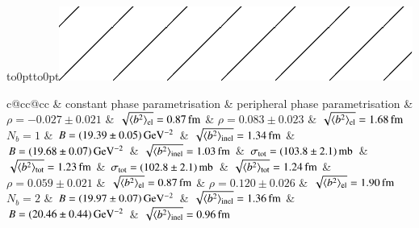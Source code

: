 \begin{table}
\caption{%
Parameters derived from the parameter-comparison fits presented in Figures~\ref{fig:fits common con} and \ref{fig:fits common per}. The rows correspond to different numbers of parameters in the nuclear modulus exponent. The left-hand (right-hand) side columns refer to fits with constant, Eq.~(\ref{eq:nuc phase con}), (peripheral, Eq.~(\ref{eq:nuc phase per})) nuclear phase parametrisation. The RMS values of impact parameter $b$ correspond to elastic (el), inelastic (inel) and any (tot) collisions. The combination $N_b = 1$ with constant phase is hatched as it is excluded by data, see Figure~\ref{fig:fits common con}.
}%
\vskip-3mm
\label{tab:fits common}
\begin{center}
\hbox to0pt{\hskip-25.5mm\vbox to0pt{\vskip6.5mm\includegraphics{fig/hatch_overlay.pdf}\vss}\hss}%
\small
\setlength{\tabcolsep}{5pt}
\begin{tabular}{c@{\hskip20pt}cc@{\hskip20pt}cc}
\hline
\hline
	& \hfil constant phase parametrisation \hfil & \hfil peripheral phase parametrisation\hfil  \cr
\hline
 			& $\rho = -0.027 \pm 0.021$ & $\sqrt{\langle b^2\rangle_{\rm el}} = 0.87\,{\rm fm}$					& $\rho = 0.083 \pm 0.023$ & $\sqrt{\langle b^2\rangle_{\rm el}} = 1.68\,{\rm fm}$					\cr
$N_b = 1$	& $B = (19.39 \pm 0.05)\,{\rm GeV^{-2}}$ & $\sqrt{\langle b^2\rangle_{\rm inel}} = 1.34\,{\rm fm}$		& $B = (19.68 \pm 0.07)\,{\rm GeV^{-2}}$ & $\sqrt{\langle b^2\rangle_{\rm inel}} = 1.03\,{\rm fm}$		\cr
			& $\sigma_{\rm tot} = (103.8 \pm 2.1)\,{\rm mb}$ & $\sqrt{\langle b^2\rangle_{\rm tot}} = 1.23\,{\rm fm}$	& $\sigma_{\rm tot} = (102.8 \pm 2.1)\,{\rm mb}$ & $\sqrt{\langle b^2\rangle_{\rm tot}} = 1.24\,{\rm fm}$	\cr\hline
%                                                                                                                                                                                                                   
 			& $\rho = 0.059 \pm 0.021$ & $\sqrt{\langle b^2\rangle_{\rm el}} = 0.87\,{\rm fm}$						& $\rho = 0.120 \pm 0.026$ & $\sqrt{\langle b^2\rangle_{\rm el}} = 1.90\,{\rm fm}$						\cr
$N_b = 2$	& $B = (19.97 \pm 0.07)\,{\rm GeV^{-2}}$ & $\sqrt{\langle b^2\rangle_{\rm inel}} = 1.36\,{\rm fm}$		& $B = (20.46 \pm 0.44)\,{\rm GeV^{-2}}$ & $\sqrt{\langle b^2\rangle_{\rm inel}} = 0.96\,{\rm fm}$		\cr

\end{tabular}
\end{center}
\end{table}
